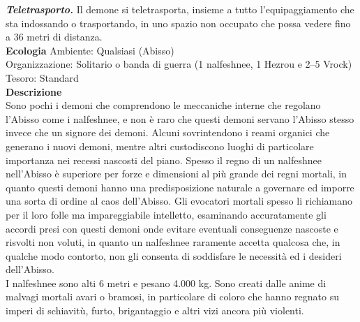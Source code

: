 \begin{multicols}{2}
\emph{\textbf{Teletrasporto.}} Il demone si teletrasporta, insieme a tutto l'equipaggiamento che sta indossando o trasportando, in uno spazio non occupato che possa vedere fino a 36 metri di distanza.\\
\textbf{Ecologia}
Ambiente: Qualsiasi (Abisso)\\
Organizzazione: Solitario o banda di guerra (1 nalfeshnee, 1 Hezrou e 2–5 Vrock)\\
Tesoro: Standard\\
\textbf{Descrizione}\\
Sono pochi i demoni che comprendono le meccaniche interne che regolano l’Abisso come i nalfeshnee, e non è raro che questi demoni servano l’Abisso stesso invece che un signore dei demoni. Alcuni sovrintendono i reami organici che generano i nuovi demoni, mentre altri custodiscono luoghi di particolare importanza nei recessi nascosti del piano. Spesso il regno di un nalfeshnee nell’Abisso è superiore per forze e dimensioni al più grande dei regni mortali, in quanto questi demoni hanno una predisposizione naturale a governare ed imporre una sorta di ordine al caos dell’Abisso. Gli evocatori mortali spesso li richiamano per il loro folle ma impareggiabile intelletto, esaminando accuratamente gli accordi presi con questi demoni onde evitare eventuali conseguenze nascoste e risvolti non voluti, in quanto un nalfeshnee raramente accetta qualcosa che, in qualche modo contorto, non gli consenta di soddisfare le necessità ed i desideri dell’Abisso.\\
I nalfeshnee sono alti 6 metri e pesano 4.000 kg. Sono creati dalle anime di malvagi mortali avari o bramosi, in particolare di coloro che hanno regnato su imperi di schiavitù, furto, brigantaggio e altri vizi ancora più violenti.\\


\end{multicols}
